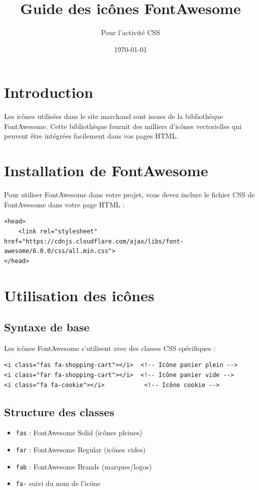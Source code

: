 \documentclass[12pt,a4paper]{article}
\title{Guide des icônes FontAwesome}
\author{Pour l'activité CSS}
\date{\today}
\begin{document}
\maketitle

\section{Introduction}

Les icônes utilisées dans le site marchand sont issues de la bibliothèque FontAwesome. Cette bibliothèque fournit des milliers d'icônes vectorielles qui peuvent être intégrées facilement dans vos pages HTML.

\section{Installation de FontAwesome}

Pour utiliser FontAwesome dans votre projet, vous devez inclure le fichier CSS de FontAwesome dans votre page HTML :

\begin{lstlisting}
<head>
    <link rel="stylesheet" href="https://cdnjs.cloudflare.com/ajax/libs/font-awesome/6.0.0/css/all.min.css">
</head>
\end{lstlisting}

\section{Utilisation des icônes}

\subsection{Syntaxe de base}

Les icônes FontAwesome s'utilisent avec des classes CSS spécifiques :

\begin{lstlisting}
<i class="fas fa-shopping-cart"></i>  <!-- Icône panier plein -->
<i class="far fa-shopping-cart"></i>  <!-- Icône panier vide -->
<i class="fa fa-cookie"></i>           <!-- Icône cookie -->
\end{lstlisting}

\subsection{Structure des classes}

\begin{itemize}
\item \texttt{fas} : FontAwesome Solid (icônes pleines)
\item \texttt{far} : FontAwesome Regular (icônes vides)
\item \texttt{fab} : FontAwesome Brands (marques/logos)
\item \texttt{fa-} suivi du nom de l'icône
\end{itemize}
\end{document}
